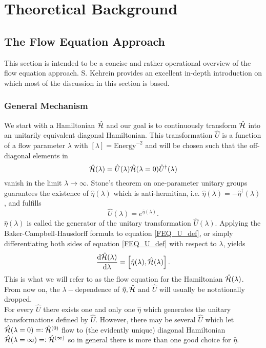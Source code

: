 \chapter{Theoretical Background}\label{Theoretical Background}
\section{The Flow Equation Approach}
This section is intended to be a concise and rather operational overview of the flow equation approach. S. Kehrein provides an excellent in-depth introduction \cite{kehrein2006flow} on which most of the discussion in this section is based.
\subsection{General Mechanism}\label{General Mechanism}
We start with a Hamiltonian $\hat{\mathcal{H}}$ and our goal is to continuously transform $\hat{\mathcal{H}}$ into an unitarily equivalent diagonal Hamiltonian. This transformation $\hat U$ is a function of a flow parameter $\lambda$ with $\left[\lambda\right]=\mathrm{Energy}^{-2}$ and will be chosen such that the off-diagonal elements in  
\begin{equation}\label{FEQ_U_def}
\hat{\mathcal{H}}(\lambda)=\hat U(\lambda)\hat{\mathcal{H}} (\lambda = 0)\hat U^\dagger (\lambda)
\end{equation}
vanish in the limit $\lambda\rightarrow\infty$. Stone's theorem on one-parameter unitary groups guarantees the existence of $\hat \eta(\lambda)$ which is anti-hermitian, i.e. $\hat\eta(\lambda) = -\hat\eta^\dagger(\lambda)$, and fulfills 
\begin{equation}
\hat U(\lambda) = e^{\hat\eta(\lambda)}.
\end{equation} 
$\hat\eta(\lambda)$ is called the generator of the unitary transformation $\hat U(\lambda)$. Applying the Baker-Campbell-Hausdorff formula to equation \ref{FEQ_U_def}, or simply differentiating both sides of equation \ref{FEQ_U_def} with respect to $\lambda$, yields
\begin{equation}\label{FEQ_ODE_def}
\frac{\mathrm d\hat{\mathcal{H}}(\lambda)}{\mathrm d\lambda} = \left[\hat\eta(\lambda),\hat{\mathcal{H}}(\lambda)\right].
\end{equation}
This is what we will refer to as the flow equation for the Hamiltonian $\hat{\mathcal{H}} (\lambda)$. From now on, the $\lambda-$dependence of $\hat\eta,\hat{\mathcal{H}}$ and $\hat U$ will usually be notationally dropped. \\
For every $\hat U$ there exists one and only one $\hat\eta$ which generates the unitary transformations defined by $\hat U$. However, there may be several $\hat U$ which let $\hat{\mathcal{H}}(\lambda = 0)=\vcentcolon \hat{\mathcal{H}}^{(0)}$ flow to (the evidently unique) diagonal Hamiltonian $\hat{\mathcal{H}}(\lambda=\infty)=\vcentcolon \hat{\mathcal{H}}^{(\infty)}$ so in general there is more than one good choice for $\hat\eta$. \\
